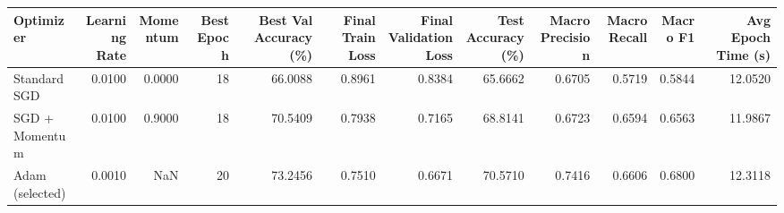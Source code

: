 \begin{tabular}{lrrrrrrrrrrr}
\toprule
Optimizer & Learning Rate & Momentum & Best Epoch & Best Val Accuracy (\%) & Final Train Loss & Final Validation Loss & Test Accuracy (\%) & Macro Precision & Macro Recall & Macro F1 & Avg Epoch Time (s) \\
\midrule
Standard SGD & 0.0100 & 0.0000 & 18 & 66.0088 & 0.8961 & 0.8384 & 65.6662 & 0.6705 & 0.5719 & 0.5844 & 12.0520 \\
SGD + Momentum & 0.0100 & 0.9000 & 18 & 70.5409 & 0.7938 & 0.7165 & 68.8141 & 0.6723 & 0.6594 & 0.6563 & 11.9867 \\
Adam (selected) & 0.0010 & NaN & 20 & 73.2456 & 0.7510 & 0.6671 & 70.5710 & 0.7416 & 0.6606 & 0.6800 & 12.3118 \\
\bottomrule
\end{tabular}
